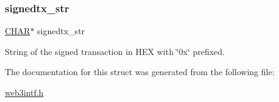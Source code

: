 \subsubsection{\texorpdfstring{signedtx\+\_\+str}{signedtx\_str}}
{\footnotesize\ttfamily \mbox{\hyperlink{boattypes_8h_aebb9e13210d88d43e32e735ada43a425}{C\+H\+AR}}$\ast$ signedtx\+\_\+str}



String of the signed transaction in H\+EX with \char`\"{}0x\char`\"{} prefixed. 



The documentation for this struct was generated from the following file\+:\begin{DoxyCompactItemize}
\item 
\mbox{\hyperlink{web3intf_8h}{web3intf.\+h}}\end{DoxyCompactItemize}

